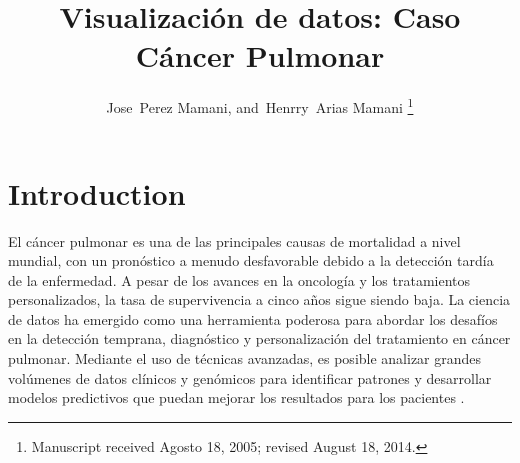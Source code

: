\documentclass[10pt,journal,compsoc]{IEEEtran}
\begin{document}
\title{Visualización de datos: Caso Cáncer Pulmonar}


\author{Jose~Perez Mamani,
        and~Henrry~Arias Mamani%
\thanks{Manuscript received Agosto 18, 2005; revised August 18, 2014.}}



\maketitle
\IEEEdisplaynontitleabstractindextext
\IEEEpeerreviewmaketitle


\ifCLASSOPTIONcompsoc
{}
\else
\section{Introduction}
\label{sec:introduction}
\fi

 El cáncer pulmonar es una de las principales causas de mortalidad a nivel mundial, con un pronóstico a menudo desfavorable debido a la detección tardía de la enfermedad. A pesar de los avances en la oncología y los tratamientos personalizados, la tasa de supervivencia a cinco años sigue siendo baja. La ciencia de datos ha emergido como una herramienta poderosa para abordar los desafíos en la detección temprana, diagnóstico y personalización del tratamiento en cáncer pulmonar. Mediante el uso de técnicas avanzadas, es posible analizar grandes volúmenes de datos clínicos y genómicos para identificar patrones y desarrollar modelos predictivos que puedan mejorar los resultados para los pacientes .
\end{document}

